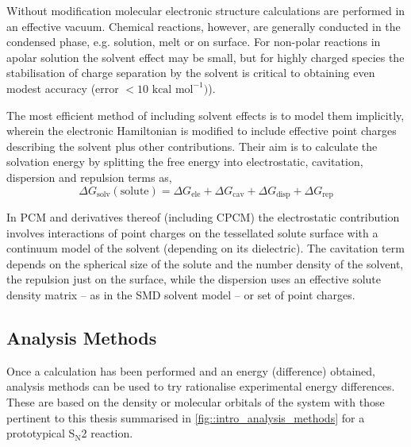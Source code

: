 \documentclass[main.tex]{subfiles}
\begin{document}
Without modification molecular electronic structure calculations are performed in an effective vacuum. Chemical reactions, however, are generally conducted in the condensed phase, e.g. solution, melt or on surface.\cite{Sievers2016} For non-polar reactions in apolar solution the solvent effect may be small,\cite{Rush2014} but for highly charged species the stabilisation of charge separation by the solvent is critical to obtaining even modest accuracy (error $< 10 \text{ kcal mol}^{-1})$).\cite{harvey2018Primer}

The most efficient method of including solvent effects is to model them implicitly, wherein the electronic Hamiltonian is modified to include effective point charges describing the solvent plus other contributions. Their aim is to calculate the solvation energy by splitting the free energy into electrostatic, cavitation, dispersion and repulsion terms as,\cite{Takano2004}
\begin{equation}
	\Delta G_\text{solv}(\text{solute}) = \Delta G_\text{ele} + \Delta G_\text{cav} + \Delta G_\text{disp} + \Delta G_\text{rep}
\end{equation}

In PCM and derivatives thereof (including CPCM) the electrostatic contribution involves interactions of point charges on the tessellated solute surface with a continuum model of the solvent (depending on its dielectric). The cavitation term depends on the spherical size of the solute and the number density of the solvent,  the repulsion just on the surface, while the dispersion uses an effective solute density matrix -- as in the SMD solvent model\cite{Marenich2009} -- or set of point charges.\cite{Tomasi2005}
 

\subsection{Analysis Methods}

Once a calculation has been performed and an energy (difference) obtained, analysis methods can be used to try rationalise experimental energy differences. These are based on the density or molecular orbitals of the system with those pertinent to this thesis summarised in \figurename{ \ref{fig::intro_analysis_methods}} for a prototypical S$_\text{N}$2 reaction. 
\end{document}
